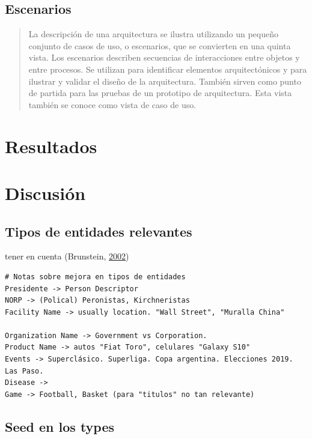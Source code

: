 \documentclass[12pt,a4paper,]{scrartcl}
\begin{document}
\hypertarget{escenarios}{%
\subsection{Escenarios}\label{escenarios}}

\begin{quote}
La descripción de una arquitectura se ilustra utilizando un pequeño conjunto de casos de uso, o escenarios, que se convierten en una quinta vista.
Los escenarios describen secuencias de interacciones entre objetos y entre procesos.
Se utilizan para identificar elementos arquitectónicos y para ilustrar y validar el diseño de la arquitectura.
También sirven como punto de partida para las pruebas de un prototipo de arquitectura.
Esta vista también se conoce como vista de caso de uso.
\end{quote}

\hypertarget{results}{%
\section{Resultados}\label{results}}

\hypertarget{discussion}{%
\section{Discusión}\label{discussion}}

\hypertarget{tipos-de-entidades-relevantes}{%
\subsection{Tipos de entidades relevantes}\label{tipos-de-entidades-relevantes}}

tener en cuenta (Brunstein, \protect\hyperlink{ref-brunstein2002}{2002})

\begin{verbatim}
# Notas sobre mejora en tipos de entidades
Presidente -> Person Descriptor
NORP -> (Polical) Peronistas, Kirchneristas
Facility Name -> usually location. "Wall Street", "Muralla China"

Organization Name -> Government vs Corporation.
Product Name -> autos "Fiat Toro", celulares "Galaxy S10"
Events -> Superclásico. Superliga. Copa argentina. Elecciones 2019. Las Paso.
Disease -> 
Game -> Football, Basket (para "titulos" no tan relevante)
\end{verbatim}

\hypertarget{seed-en-los-types}{%
\subsection{Seed en los types}\label{seed-en-los-types}}
\end{document}
